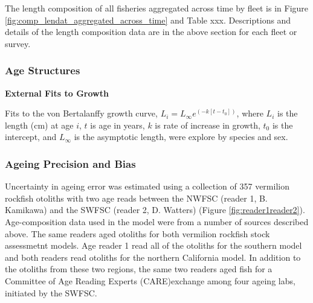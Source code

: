 \documentclass[11pt,
  english,
  a4paper,
]{article}
\begin{document}
\tagstructend

The length composition of all fisheries aggregated across time by fleet is in Figure \ref{fig:comp_lendat_aggregated_across_time} and Table xxx. Descriptions and details of the length composition data are in the above section for each fleet or survey.


\hypertarget{age-structures}{%
\subsubsection{Age Structures}\label{age-structures}}

\leavevmode\tagmcend\tagstructend

\textbf{External Fits to Growth}

Fits to the von Bertalanffy growth curve, {\(L_i = L_{\infty}e^{(-k[t-t_0])}\)\leavevmode\tagmcend\tagstructend}, where {\(L_i\)\leavevmode\tagmcend\tagstructend} is the length (cm) at age {\(i\)\leavevmode\tagmcend\tagstructend}, {\(t\)\leavevmode\tagmcend\tagstructend} is age in years, {\(k\)\leavevmode\tagmcend\tagstructend} is rate of increase in growth, {\(t_0\)\leavevmode\tagmcend\tagstructend} is the intercept, and {\(L_{\infty}\)\leavevmode\tagmcend\tagstructend} is the asymptotic length, were explore by species and sex.


\hypertarget{ageing-precision-and-bias}{%
\subsubsection{Ageing Precision and Bias}\label{ageing-precision-and-bias}}

\leavevmode\tagmcend\tagstructend

Uncertainty in ageing error was estimated using a collection of 357 vermilion rockfish otoliths with two age reads between the NWFSC (reader 1, B. Kamikawa) and the SWFSC (reader 2, D. Watters) (Figure \ref{fig:reader1reader2}). Age-composition data used in the model were from a number of sources described above. The same readers aged otoliths for both vermilion rockfish stock assessmetnt models. Age reader 1 read all of the otoliths for the southern model and both readers read otoliths for the northern California model. In addition to the otoliths from these two regions, the same two readers aged fish for a Committee of Age Reading Experts (CARE)exchange among four ageing labs, initiated by the SWFSC.
\end{document}
